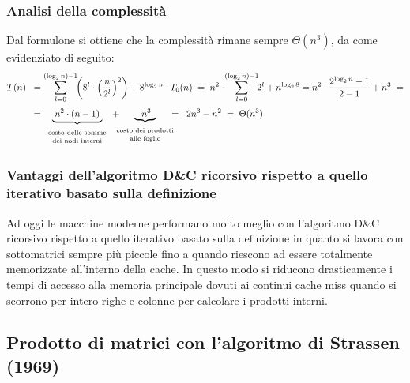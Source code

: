 \subsubsection*{Analisi della complessità}
Dal formulone si ottiene che la complessità rimane sempre \(\Theta(n^3)\), da come evidenziato di seguito:
\begin{align*}
	T(n) \;\; &= \sum_{l=0}^{(\log_2 n) - 1} \!\! \left( 8^l \cdot \left( \frac{n}{2^l} \right)^2 \right) + 8^{\log_2 n} \cdot T_0(n) \; = \; n^2 \cdot \! \sum_{l=0}^{(\log_2 n) - 1} \!\! 2^l + n^{\log_2 8} = n^2 \cdot \frac{2^{\log_2 n} - 1}{2 - 1} + n^3 \; = \\[3pt]
	&= \underbrace{\;n^2 \cdot (n - 1)\;}_{\begin{array}{c} \text{\scriptsize costo delle somme} \\[-3pt] \text{\scriptsize dei nodi interni} \end{array}}
	+ \!\!\!\!\!\! \underbrace{\;\;\; n^3 \;\;}_{\begin{array}{c} \text{\scriptsize costo dei prodotti} \\[-3pt] \text{\scriptsize alle foglie} \end{array}}
	\!\!\!\!\!\! =  \;\; 2n^3 - n^2  \; = \; \Theta(n^3)
\end{align*}

\subsubsection*{Vantaggi dell'algoritmo D\&C ricorsivo rispetto a quello iterativo basato sulla definizione}
Ad oggi le macchine moderne performano molto meglio con l'algoritmo D\&C ricorsivo rispetto a quello iterativo basato sulla
definizione in quanto si lavora con sottomatrici sempre più piccole fino a quando riescono ad essere totalmente memorizzate
all'interno della cache. In questo modo si riducono drasticamente i tempi di accesso alla memoria principale dovuti ai
continui cache miss quando si scorrono per intero righe e colonne per calcolare i prodotti interni.

\subsection{Prodotto di matrici con l'algoritmo di Strassen (1969)}
